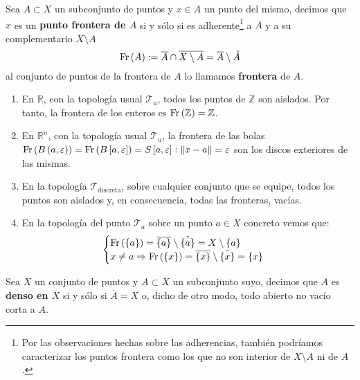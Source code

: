 \begin{defi}[Frontera]
Sea $A\subset X$ un subconjunto de puntos y $x\in A$ un punto del mismo, decimos que $x$ es un \textbf{punto frontera de $A$} si y sólo si es adherente\footnote{Por las observaciones hechas sobre las adherencias, también podríamos caracterizar los puntos frontera como los que no son interior de $X \setminus A$ ni de $A$.} a $A$ y a su complementario $X \setminus A$
    \[
    \operatorname{Fr}\left( A \right) := \overline{A} \cap \overline{X \setminus A} = \overline{A} \setminus \mathring{A}     
    \]
al conjunto de puntos de la frontera de $A$ lo llamamos \textbf{frontera} de $A$.
\end{defi}

\begin{ej}
\begin{enumerate}
    \item En $\mathbb{R}$, con la topología usual $\mathcal{T}_u$, todos los puntos de $\mathbb{Z}$ son aislados. Por tanto, la frontera de los enteros es $\operatorname{Fr}\left( \mathbb{Z} \right) = \mathbb{Z}$.
    \item En $\mathbb{R}^n$, con la topología usual $\mathcal{T}_u$, la frontera de las bolas $\operatorname{Fr}\left( B\left( a, \varepsilon \right) \right) = \operatorname{Fr}\left( B\left[ a, \varepsilon \right] \right) = S\left[ a, \varepsilon \right] : \lVert x - a \rVert = \varepsilon$ son los discos exteriores de las mismas.
    \item En la topología $\mathcal{T}_{\text{discreta}}$, sobre cualquier conjunto que se equipe, todos los puntos son aislados y, en consecuencia, todas las fronteras, vacías.
    \item En la topología del punto $\mathcal{T}_a$ sobre un punto $a \in X$ concreto vemos que:
$$
\begin{cases}
	\operatorname{Fr}\left( \{a\} \right) = \overline{\{a\}} \setminus \mathring{\{a\}} = X \setminus \{a\} \\
    x \neq a \Rightarrow \operatorname{Fr}\left( \{x\} \right) = \overline{\{x\}} \setminus \mathring{\{x\}} = \{x\} 
\end{cases} 
$$
\end{enumerate}
\end{ej}

\begin{defi}[Densidad]
Sea $X$ un conjunto de puntos y $A \subset X$ un subconjunto suyo, decimos que $A$ es \textbf{denso en $X$} si y sólo si $\overline{A} = X$ o, dicho de otro modo, todo abierto no vacío corta a $A$.
\end{defi}

